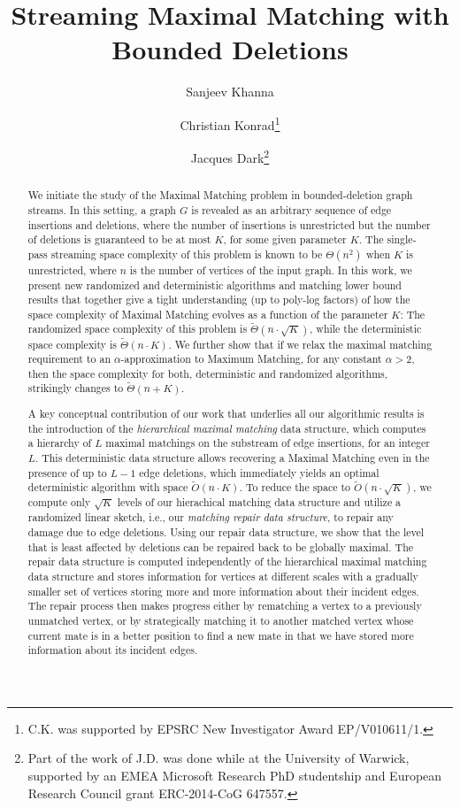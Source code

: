\documentclass[11pt,a4paper]{article}
\title{Streaming Maximal Matching with Bounded Deletions}
\author[1]{Sanjeev Khanna}
\author[2]{Christian Konrad\footnote{C.K. was supported by EPSRC New Investigator Award EP/V010611/1.}}
\author[3]{Jacques Dark\footnote{Part of the work of J.D. was done while at the University of Warwick,
supported by an EMEA Microsoft Research PhD studentship and European Research Council grant
ERC-2014-CoG 647557.}}
\affil[1]{Department of Computer and Information Science, University of Pennsylvania, Philadelphia, PA, US,
\texttt{sanjeev@cis.upenn.edu}
}
\affil[2]{Department of Computer Science,
University of Bristol, Bristol, UK,
\texttt{christian.konrad@bristol.ac.uk}}
\affil[3]{Unaffiliated Researcher, London, UK,
\texttt{thejdark@gmail.com}}
\date{}
\begin{document}
\maketitle
\thispagestyle{empty} 

\vspace{-0.5cm}
\begin{abstract}
We initiate the study of the \textsf{Maximal Matching} problem in bounded-deletion graph streams. In this setting, a graph $G$ is revealed as an arbitrary sequence of edge insertions and deletions, where the number of insertions is unrestricted but the number of deletions is guaranteed to be at most $K$, for some given parameter $K$. The single-pass streaming space complexity of this problem is known to be $\Theta(n^2)$ when $K$ is unrestricted, where $n$ is the number of vertices of the input graph. 
In this work, we present new randomized and deterministic algorithms and matching lower bound results that together give a tight understanding (up to poly-log factors) of how the space complexity of \textsf{Maximal Matching} evolves as a function of the parameter $K$: The randomized space complexity of this problem is $\tilde{\Theta}(n \cdot \sqrt{K})$, while the deterministic space complexity is $\tilde{\Theta}(n \cdot K)$.
We further show that if we relax the maximal matching requirement to an $\alpha$-approximation to \textsf{Maximum Matching}, for any constant $\alpha > 2$, then the space complexity for both, deterministic and randomized algorithms, strikingly changes to $\tilde{\Theta}(n + K)$. 

\smallskip

A key conceptual contribution of our work that underlies all our algorithmic results is the introduction of the {\em hierarchical maximal matching} data structure, which computes a hierarchy of $L$ maximal matchings on the substream of edge insertions, for an integer $L$. This deterministic data structure allows recovering a \textsf{Maximal Matching} even in the presence of up to $L-1$ edge deletions, which immediately yields an optimal deterministic algorithm with space $\tilde{O}(n \cdot K)$. To reduce the space to $\tilde{O}(n \cdot \sqrt{K})$, we compute only $\sqrt{K}$ levels of our hierachical matching data structure and utilize a randomized linear sketch, i.e., our {\em matching repair data structure}, to repair any damage due to edge deletions. Using our repair data structure, we show that the level that is least affected by deletions can be repaired back to be globally maximal. The repair data structure is computed independently of the hierarchical maximal matching data structure and stores information for vertices at different scales with a gradually smaller set of vertices storing more and more information about their incident edges. The repair process then makes progress either by rematching a vertex to a previously unmatched vertex, or by strategically matching it to another matched vertex whose current mate is in a better position to find a new mate in that we have stored more information about its incident edges. 


\end{abstract}
\end{document}
